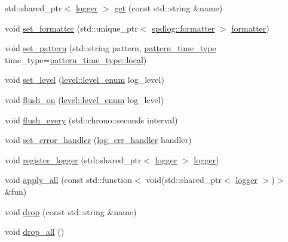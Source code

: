 \begin{DoxyCompactItemize}
\item 
std\+::shared\+\_\+ptr$<$ \hyperlink{classspdlog_1_1logger}{logger} $>$ \hyperlink{namespacespdlog_a658d68d4ebdb11793b1e78582f108674}{get} (const std\+::string \&name)
\item 
void \hyperlink{namespacespdlog_a83007016a4f374c8efcc738eee5b7290}{set\+\_\+formatter} (std\+::unique\+\_\+ptr$<$ \hyperlink{classspdlog_1_1formatter}{spdlog\+::formatter} $>$ \hyperlink{classspdlog_1_1formatter}{formatter})
\item 
void \hyperlink{namespacespdlog_a638029f343e8dd2393d62288b1eb095e}{set\+\_\+pattern} (std\+::string pattern, \hyperlink{namespacespdlog_ad598fbd8338772e66ae09e8723a07ced}{pattern\+\_\+time\+\_\+type} time\+\_\+type=\hyperlink{namespacespdlog_ad598fbd8338772e66ae09e8723a07cedaf5ddaf0ca7929578b408c909429f68f2}{pattern\+\_\+time\+\_\+type\+::local})
\item 
void \hyperlink{namespacespdlog_a9f952c6a1e1114b474aff89965261a1b}{set\+\_\+level} (\hyperlink{namespacespdlog_1_1level_a35f5227e5daf228d28a207b7b2aefc8b}{level\+::level\+\_\+enum} log\+\_\+level)
\item 
void \hyperlink{namespacespdlog_afac55b239302064cba773add59b635d1}{flush\+\_\+on} (\hyperlink{namespacespdlog_1_1level_a35f5227e5daf228d28a207b7b2aefc8b}{level\+::level\+\_\+enum} log\+\_\+level)
\item 
void \hyperlink{namespacespdlog_a70d5763d644df282a67999baf4680dde}{flush\+\_\+every} (std\+::chrono\+::seconds interval)
\item 
void \hyperlink{namespacespdlog_aff4886a7bf8585815d8fd1f819f91be0}{set\+\_\+error\+\_\+handler} (\hyperlink{namespacespdlog_ad3ed787a29f245c833ef66faf48036e2}{log\+\_\+err\+\_\+handler} handler)
\item 
void \hyperlink{namespacespdlog_a306f1c2ef42ba046620bd84266ee5b24}{register\+\_\+logger} (std\+::shared\+\_\+ptr$<$ \hyperlink{classspdlog_1_1logger}{logger} $>$ \hyperlink{classspdlog_1_1logger}{logger})
\item 
void \hyperlink{namespacespdlog_a33b888a87a0fccc7b7dd5b89413ce6b7}{apply\+\_\+all} (const std\+::function$<$ void(std\+::shared\+\_\+ptr$<$ \hyperlink{classspdlog_1_1logger}{logger} $>$)$>$ \&fun)
\item 
void \hyperlink{namespacespdlog_af2ec5792fb30798cf285da36cb5c9377}{drop} (const std\+::string \&name)
\item 
void \hyperlink{namespacespdlog_ab1211636fc47637f4dc5ee9a18aa1bce}{drop\+\_\+all} ()
\item 

\end{DoxyCompactItemize}
